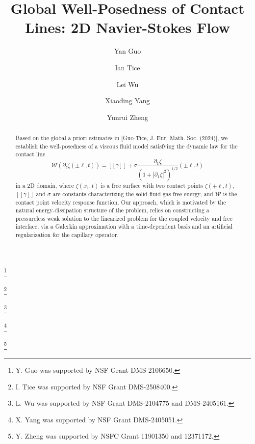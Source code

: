 \documentclass[letterpaper,reqno,10pt,twoside]{amsart}
\theoremstyle{definition}
\theoremstyle{remark}
\def\p{\partial}
\begin{document}
	
	\title{Global Well-Posedness of Contact Lines: 2D Navier-Stokes Flow}
	
	\author[Y. Guo]{Yan Guo}
	\address[Y. Guo]{
		\newline\indent Division of Applied Mathematics, Brown University, Providence, RI 02912, USA}
	\thanks{Y. Guo was supported by NSF Grant DMS-2106650.}
	
	\author[I. Tice]{Ian Tice}
	\address[I. Tice]{
		\newline\indent Department of Mathematical Sciences, Carnegie Mellon University, Pittsburgh, PA 15213, USA}
	\thanks{I. Tice was supported by NSF Grant DMS-2508400.}
	
	\author[L. Wu]{Lei Wu}
	\address[L. Wu]{
		\newline\indent Department of Mathematics, Lehigh University, Bethlehem, PA 18015, USA}
	\thanks{L. Wu was supported by NSF Grant DMS-2104775 and DMS-2405161.}
	
	\author[X. Yang]{Xiaoding Yang}
	\address[X. Yang]{
		\newline\indent Division of Applied Mathematics, Brown University, Providence, RI 02912, USA}
	\thanks{X. Yang was supported by NSF Grant DMS-2405051.}
	
	\author[Y. Zheng]{Yunrui Zheng}
	\address[Y. Zheng]{
		\newline\indent School of Mathematics, Shandong University, Shandong 250100, Jinan, P. R. China}
	\thanks{Y. Zheng was supported by NSFC Grant 11901350 and 12371172.}
	
	\date{}
	
	
	
	\begin{abstract}
		Based on the global a priori estimates in [Guo-Tice, J. Eur. Math. Soc. (2024)], we establish the well-posedness of a viscous fluid model satisfying the dynamic law for the contact line
		\begin{equation*}
			\mathscr{W}(\p_t\zeta(\pm\ell,t))=[\![\gamma]\!]\mp\sigma\frac{\p_1\zeta}{(1+|\p_1\zeta|^2)^{1/2}}(\pm\ell,t)
		\end{equation*}
		in a 2D domain, where $\zeta(x_1,t)$ is a free surface with two contact points $\zeta(\pm\ell,t)$, $[\![\gamma]\!]$ and $\sigma$ are constants characterizing the solid-fluid-gas free energy, and  $\mathscr{W}$ is the contact point velocity response function.  Our approach, which is motivated by the natural energy-dissipation structure of the problem, relies on constructing a pressureless weak solution to the linearized problem for the coupled velocity and free interface, via a Galerkin approximation with a time-dependent basis and an artificial regularization for the capillary operator.
	\end{abstract}
	
\end{document}
